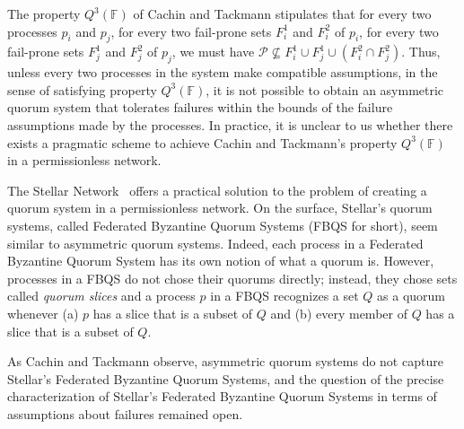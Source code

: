 \documentclass[11pt]{article}
\begin{document}

The property $Q^3(\mathbb{F})$ of Cachin and Tackmann stipulates that for every two processes $p_i$ and $p_j$, for every two fail-prone sets $F_i^1$ and $F_i^2$ of $p_i$, for every two fail-prone sets $F_j^1$ and $F_j^2$ of $p_j$, we must have $\mathcal{P}\not\subseteq F_i^1\cup F_j^1\cup \left(F_i^2\cap F_j^2\right)$. Thus, unless every two processes in the system make compatible assumptions, in the sense of satisfying property $Q^3(\mathbb{F})$, it is not possible to obtain an asymmetric quorum system that tolerates failures within the bounds of the failure assumptions made by the processes. In practice, it is unclear to us whether there exists a pragmatic scheme to achieve Cachin and Tackmann's property $Q^3(\mathbb{F})$ in a permissionless network.


The Stellar Network~\cite{MazieresStellarConsensusProtocol2015,lokhavaFastSecureGlobal2019} offers a practical solution to the problem of creating a quorum system in a permissionless network. On the surface, Stellar's quorum systems, called Federated Byzantine Quorum Systems (FBQS for short), seem similar to asymmetric quorum systems. Indeed, each process in a Federated Byzantine Quorum System has its own notion of what a quorum is. However, processes in a FBQS do not chose their quorums directly; instead, they chose sets called \emph{quorum slices} and a process $p$ in a FBQS recognizes a set $Q$ as a quorum whenever (a) $p$ has a slice that is a subset of $Q$ and (b) every member of $Q$ has a slice that is a subset of $Q$.

As Cachin and Tackmann observe, asymmetric quorum systems do not capture Stellar's Federated Byzantine Quorum Systems, and the question of the precise characterization of Stellar's Federated Byzantine Quorum Systems in terms of assumptions about failures remained open.
\end{document}
